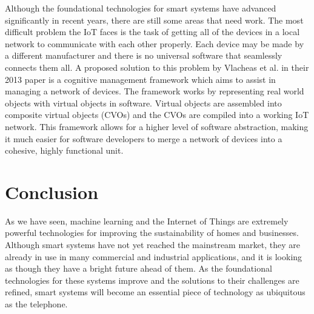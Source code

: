 \documentclass[letterpaper]{article}
\begin{document}
Although the foundational technologies for smart systems have advanced significantly in recent years, there are still some areas that need work. The most difficult problem the IoT faces is the task of getting all of the devices in a local network to communicate with each other properly. Each device may be made by a different manufacturer and there is no universal software that seamlessly connects them all. A proposed solution to this problem by Vlacheas et al. \cite{vlacheas13} in their 2013 paper is a cognitive management framework which aims to assist in managing a network of devices. The framework works by representing real world objects with virtual objects in software. Virtual objects are assembled into composite virtual objects (CVOs) and the CVOs are compiled into a working IoT network. This framework allows for a higher level of software abstraction, making it much easier for software developers to merge a network of devices into a cohesive, highly functional unit.

\section{Conclusion} \label{conc}
As we have seen, machine learning and the Internet of Things are extremely powerful technologies for improving the sustainability of homes and businesses. Although smart systems have not yet reached the mainstream market, they are already in use in many commercial and industrial applications, and it is looking as though they have a bright future ahead of them. As the foundational technologies for these systems improve and the solutions to their challenges are refined, smart systems will become an essential piece of technology as ubiquitous as the telephone.

\clearpage
\printbibliography
\end{document}
